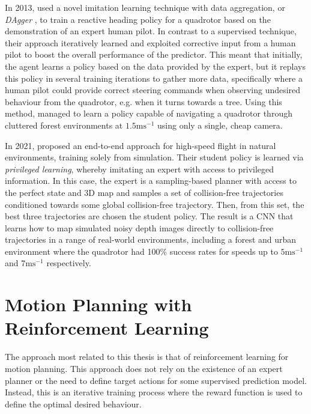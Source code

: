 In 2013, \cite{monocularReactiveUAVControl} used a novel imitation learning technique with data aggregation, or \textit{DAgger} \cite{DAgger}, to train a reactive heading policy for a quadrotor based on the demonstration of an expert human pilot. In contrast to a supervised technique, their approach iteratively learned and exploited corrective input from a human pilot to boost the overall performance of the predictor. This meant that initially, the agent learns a policy based on the data provided by the expert, but it replays this policy in several training iterations to gather more data, specifically where a human pilot could provide correct steering commands when observing undesired behaviour from the quadrotor, e.g. when it turns towards a tree. 
Using this method, \cite{monocularReactiveUAVControl} managed to learn a policy capable of navigating a quadrotor through cluttered forest environments at $1.5\text{ms}^{-1}$ using only a single, cheap camera.

In 2021, \cite{HighSpeedFlightWild} proposed an end-to-end approach for high-speed flight in natural environments, training solely from simulation. Their student policy is learned via \textit{privileged learning}, whereby imitating an expert with access to privileged information. In this case, the expert is a sampling-based planner with access to the perfect state and 3D map and samples a set of collision-free trajectories conditioned towards some global collision-free trajectory. Then, from this set, the best three trajectories are chosen the student policy.
The result is a CNN that learns how to map simulated noisy depth images directly to collision-free trajectories in a range of real-world environments, including a forest and urban environment where the quadrotor had 100\% success rates for speeds up to $5\text{ms}^{-1}$ and $7\text{ms}^{-1}$ respectively.


\section{Motion Planning with Reinforcement Learning}
\label{sec:3_reinforcement_learning}
The approach most related to this thesis is that of reinforcement learning for motion planning. This approach does not rely on the existence of an expert planner or the need to define target actions for some supervised prediction model. Instead, this is an iterative training process where the reward function is used to define the optimal desired behaviour.

